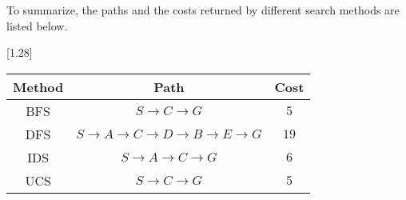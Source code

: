 \documentclass{article}
\begin{document}
    \bigskip
    To summarize, the paths and the costs returned by different search methods are listed below.
    \medskip
    \begin{center}
        \scalebox{1.25}[1.28]{
            \begin{tabular}{|c||c||c|}
                \hline
                Method & Path & Cost \\
                \hline
                BFS & $ S \rightarrow C \rightarrow G $ & $ 5 $ \\
                \hline
                DFS & $ S \rightarrow A \rightarrow C \rightarrow D \rightarrow B \rightarrow E \rightarrow G $ & $ 19 $ \\
                \hline
                IDS & $ S \rightarrow A \rightarrow C \rightarrow G $ & $ 6 $ \\
                \hline
                UCS & $ S \rightarrow C \rightarrow G $ & $ 5 $ \\
                \hline
            \end{tabular}
        }
    \end{center}
\end{document}
